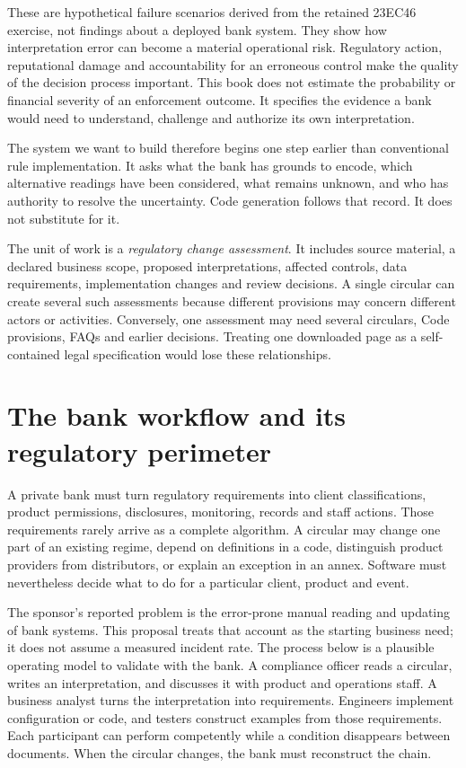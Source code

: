 These are hypothetical failure scenarios derived from the retained 23EC46
exercise, not findings about a deployed bank system. They show how interpretation error can become a material operational risk. Regulatory action,
reputational damage and accountability for an erroneous control make the quality
of the decision process important. This book does not estimate the probability
or financial severity of an enforcement outcome. It specifies the evidence a
bank would need to understand, challenge and authorize its own interpretation.

The system we want to build therefore begins one step earlier than conventional
rule implementation. It asks what the bank has grounds to encode, which
alternative readings have been considered, what remains unknown, and who has
authority to resolve the uncertainty. Code generation follows that record. It
does not substitute for it.

The unit of work is a \emph{regulatory change assessment}. It includes source
material, a declared business scope, proposed interpretations, affected controls,
data requirements, implementation changes and review decisions. A single
circular can create several such assessments because different provisions may
concern different actors or activities. Conversely, one assessment may need
several circulars, Code provisions, FAQs and earlier decisions. Treating one
downloaded page as a self-contained legal specification would lose these
relationships.

\section{The bank workflow and its regulatory perimeter}
\label{merge:P-01-problem:00}

\label{sec:problem}

A private bank must turn regulatory requirements into client classifications,
product permissions, disclosures, monitoring, records and staff actions. Those
requirements rarely arrive as a complete algorithm. A circular may change one
part of an existing regime, depend on definitions in a code, distinguish product
providers from distributors, or explain an exception in an annex. Software must
nevertheless decide what to do for a particular client, product and event.

The sponsor's reported problem is the error-prone manual reading and updating of
bank systems. This proposal treats that account as the starting business need;
it does not assume a measured incident rate. The process below is a plausible
operating model to validate with the bank. A compliance officer reads a circular,
writes an interpretation, and discusses it with product and operations staff. A
business analyst turns the interpretation into requirements. Engineers implement
configuration or code, and testers construct examples from those requirements.
Each participant can perform competently while a condition disappears between
documents. When the circular changes, the bank must reconstruct the chain.

